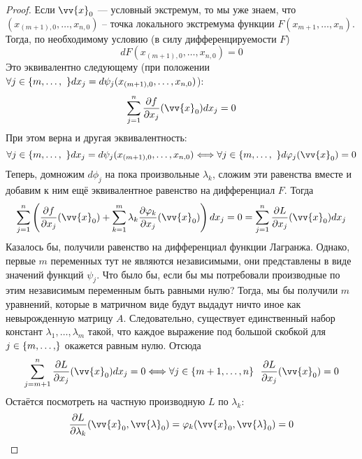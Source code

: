 \begin{proof}
	Если $\vv{x}_0$ --- условный экстремум, то мы уже знаем, что $(x_{(m + 1), 0}, \ldots, x_{n, 0})$ -- точка локального экстремума функции $F(x_{m + 1}, \ldots, x_n)$. Тогда, по необходимому условию (в силу дифференцируемости $F$)
	\[
		dF(x_{(m + 1), 0}, \ldots, x_{n, 0}) = 0
	\]
	Это эквивалентно следующему (при положении $\forall j \in \{m, \ldots, \ \}dx_j = d\psi_j(x_{(m + 1), 0}, \ldots, x_{n, 0})$):
	\[
		\sum_{j = 1}^n \pd{f}{x_j} (\vv{x}_0) dx_j = 0
	\]
	При этом верна и другая эквивалентность:
	\[
		\forall j \in \range{m}\ dx_j = d\psi_j(x_{(m + 1), 0}, \ldots, x_{n, 0}) \Longleftrightarrow \forall j \in \range{m}\ d\phi_j(\vv{x}_0) = 0
	\]
	Теперь, домножим $d\phi_j$ на пока произвольные $\lambda_k$, сложим эти равенства вместе и добавим к ним ещё эквивалентное равенство на дифференциал $F$. Тогда
	\[
		\sum_{j = 1}^n \ps{\pd{f}{x_j}(\vv{x}_0) + \sum_{k = 1}^m \lambda_k \pd{\phi_k}{x_j}(\vv{x}_0)}dx_j = 0 = \sum_{j = 1}^n \pd{L}{x_j}(\vv{x}_0)dx_j
	\]
	Казалось бы, получили равенство на дифференциал функции Лагранжа. Однако, первые $m$ переменных тут не являются независимыми, они представлены в виде значений функций $\psi_j$. Что было бы, если бы мы потребовали производные по этим независимым переменным быть равными нулю? Тогда, мы бы получили $m$ уравнений, которые в матричном виде будут выдадут ничто иное как невырожденную матрицу $A$. Следовательно, существует единственный набор констант $\lambda_1, \ldots, \lambda_m$ такой, что каждое выражение под большой скобкой для $j \in \range{m}$ окажется равным нулю. Отсюда
	\[
		\sum_{j = m + 1}^n \pd{L}{x_j} (\vv{x}_0) dx_j = 0 \Longleftrightarrow \forall j \in \{m + 1, \ldots, n\}\ \ \pd{L}{x_j}(\vv{x}_0) = 0
	\]
	Остаётся посмотреть на частную производную $L$ по $\lambda_k$:
	\[
		\pd{L}{\lambda_k}(\vv{x}_0, \vv{\lambda}_0) = \phi_k(\vv{x}_0, \vv{\lambda}_0) = 0
	\]
\end{proof}

